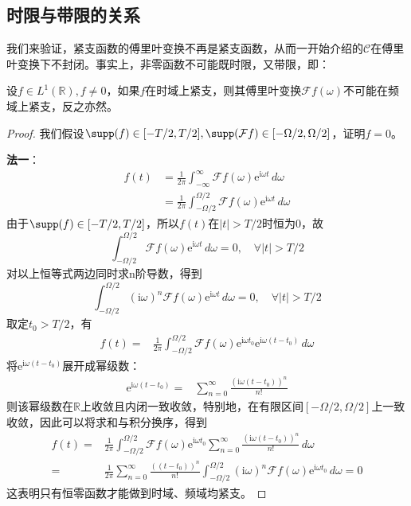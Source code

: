 \subsection{时限与带限的关系}\label{sub:time_freq_limit}
我们来验证，紧支函数的傅里叶变换不再是紧支函数，从而一开始介绍的$\mathcal{C} $在傅里叶变换下不封闭。事实上，非零函数不可能既时限，又带限，即：
\begin{theorem}
    \label{thm:time_freq_limit}
    设$f\in L^1(\mathbb{R}),f\neq 0$，如果$f$在时域上紧支，则其傅里叶变换$\mathcal{F} f(\omega)$不可能在频域上紧支，反之亦然。
\end{theorem}

\begin{proof}
    我们假设$\supp(f)\in[-T/2,T/2],\supp(\mathcal{F}f)\in[-\Omega/2,\Omega/2]$，证明$f=0$。

    \textbf{法一}：
    \begin{align*}
        f(t) & =\frac{1}{2\pi}\int_{-\infty}^{\infty}\mathcal{F} f(\omega)\mathrm{e}^{\mathrm{i}\omega t}\,d\omega     \\
             & =\frac{1}{2\pi}\int_{-\Omega/2}^{\Omega/2}\mathcal{F} f(\omega)\mathrm{e}^{\mathrm{i}\omega t}\,d\omega
    \end{align*}
    由于$\supp(f)\in[-T/2,T/2]$，所以$f(t)$在$|t|>T/2$时恒为0，故\[\int_{-\Omega/2}^{\Omega/2}\mathcal{F} f(\omega)\mathrm{e}^{\mathrm{i}\omega t}\,d\omega=0,\quad \forall |t|>T/2\]
    对以上恒等式两边同时求n阶导数，得到\[\int_{-\Omega/2}^{\Omega/2}(\mathrm{i}\omega)^n \mathcal{F} f(\omega)\mathrm{e}^{\mathrm{i}\omega t}\,d\omega=0,\quad \forall |t|>T/2\]
    取定$t_0>T/2$，有\begin{align*}
        f(t)= & \frac{1}{2\pi}\int_{-\Omega/2}^{\Omega/2}\mathcal{F} f(\omega)\mathrm{e}^{\mathrm{i}\omega t_0}\mathrm{e}^{\mathrm{i}\omega (t-t_0)}\,d\omega
    \end{align*}
    将$\mathrm{e}^{\mathrm{i}\omega (t-t_0)}$展开成幂级数：\begin{align*}
        \mathrm{e}^{\mathrm{i}\omega (t-t_0)}= & \sum_{n=0}^{\infty}\frac{(\mathrm{i}\omega (t-t_0))^n}{n!}
    \end{align*}
    则该幂级数在$\mathbb{R}$上收敛且内闭一致收敛，特别地，在有限区间$[-\Omega/2,\Omega/2]$上一致收敛，因此可以将求和与积分换序，得到\begin{align*}
        f(t)= & \frac{1}{2\pi}\int_{-\Omega/2}^{\Omega/2}\mathcal{F} f(\omega)\mathrm{e}^{\mathrm{i}\omega t_0}\sum_{n=0}^{\infty}\frac{(\mathrm{i}\omega (t-t_0))^n}{n!}\,d\omega       \\
        =     & \frac{1}{2\pi}\sum_{n=0}^{\infty}\frac{((t-t_0))^n}{n!}\int_{-\Omega/2}^{\Omega/2}(\mathrm{i}\omega)^n \mathcal{F} f(\omega)\mathrm{e}^{\mathrm{i}\omega t_0}\,d\omega=0
    \end{align*}
    这表明只有恒零函数才能做到时域、频域均紧支。


\end{proof}
